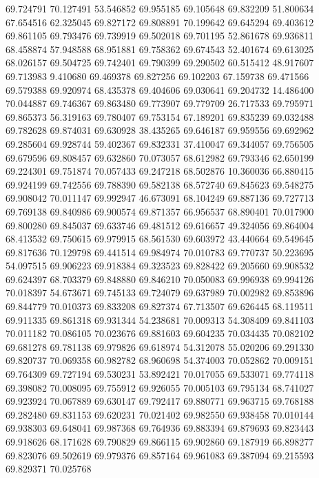 69.724791
70.127491
53.546852
69.955185
69.105648
69.832209
51.800634
67.654516
62.325045
69.827172
69.808891
70.199642
69.645294
69.403612
69.861105
69.793476
69.739919
69.502018
69.701195
52.861678
69.936811
68.458874
57.948588
68.951881
69.758362
69.674543
52.401674
69.613025
68.026157
69.504725
69.742401
69.790399
69.290502
60.515412
48.917607
69.713983
9.410680
69.469378
69.827256
69.102203
67.159738
69.471566
69.579388
69.920974
68.435378
69.404606
69.030641
69.204732
14.486400
70.044887
69.746367
69.863480
69.773907
69.779709
26.717533
69.795971
69.865373
56.319163
69.780407
69.753154
67.189201
69.835239
69.032488
69.782628
69.874031
69.630928
38.435265
69.646187
69.959556
69.692962
69.285604
69.928744
59.402367
69.832331
37.410047
69.344057
69.756505
69.679596
69.808457
69.632860
70.073057
68.612982
69.793346
62.650199
69.224301
69.751874
70.057433
69.247218
68.502876
10.360036
66.880415
69.924199
69.742556
69.788390
69.582138
68.572740
69.845623
69.548275
69.908042
70.011147
69.992947
46.673091
68.104249
69.887136
69.727713
69.769138
69.840986
69.900574
69.871357
66.956537
68.890401
70.017900
69.800280
69.845037
69.633746
69.481512
69.616657
49.324056
69.864004
68.413532
69.750615
69.979915
68.561530
69.603972
43.440664
69.549645
69.817636
70.129798
69.441514
69.984974
70.010783
69.770737
50.223695
54.097515
69.906223
69.918384
69.323523
69.828422
69.205660
69.908532
69.624397
68.703379
69.848880
69.846210
70.050083
69.996938
69.994126
70.018397
54.673671
69.745133
69.724079
69.637989
70.002982
69.853896
69.844779
70.010373
69.833208
69.827374
67.713507
69.626445
68.119511
69.911335
69.861318
69.931344
54.238681
70.009313
54.308409
69.841103
70.011182
70.086105
70.023676
69.881603
69.604235
70.034435
70.082102
69.681278
69.781138
69.979826
69.618974
54.312078
55.020206
69.291330
69.820737
70.069358
60.982782
68.960698
54.374003
70.052862
70.009151
69.764309
69.727194
69.530231
53.892421
70.017055
69.533071
69.774118
69.398082
70.008095
69.755912
69.926055
70.005103
69.795134
68.741027
69.923924
70.067889
69.630147
69.792417
69.880771
69.963715
69.768188
69.282480
69.831153
69.620231
70.021402
69.982550
69.938458
70.010144
69.938303
69.648041
69.987368
69.764936
69.883394
69.879693
69.823443
69.918626
68.171628
69.790829
69.866115
69.902860
69.187919
66.898277
69.823076
69.502619
69.979376
69.857164
69.961083
69.387094
69.215593
69.829371
70.025768
